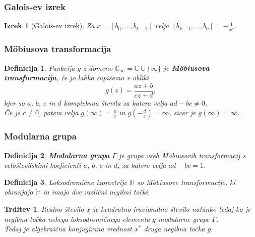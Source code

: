 \documentclass{beamer}
\newtheorem{izrek}[theorem]{Izrek}
\newtheorem{trditev}[theorem]{Trditev}
\newtheorem{definicija}{Definicija}
\begin{document}
\begin{frame}
\frametitle{Galois-ev izrek}
\begin{izrek}[Galois-ev izrek]
    \label{Galois}
    Za $x = \overline{[b_0, \ldots, b_{k-1}]}$ velja $\overline{[b_{k-1}, \ldots, b_0]} = - \frac{1}{x^*}.$
\end{izrek}
\end{frame}



\begin{frame}
\frametitle{M\"obiusova transformacija}
\begin{definicija}
    Funkcija $g$ z domeno $\mathbb{C}_{\infty} = \mathbb{C} \cup \{\infty\}$ je \textbf{M\"obiusova transformacija}, če jo lahko zapišemo v obliki
    \[
        g(z) = \frac{az + b}{cz + d},
    \]
    kjer so $a$, $b$, $c$ in $d$ kompleksna števila za katera velja $ad - bc \neq 0$. \\
    Če je $c \neq 0$, potem velja $g(\infty) = \frac{a}{c}$ in $g(-\frac{d}{c}) = \infty$, sicer je $g(\infty) = \infty$.
\end{definicija}
\end{frame}

\begin{frame}
\frametitle{Modularna grupa}
\begin{definicija}
    \textbf{Modularna grupa} $\Gamma$ je grupa vseh M\"obiusovih transformacij s celoštevilskimi koeficienti $a$, $b$, $c$ in $d$, za katere velja $ad - bc = 1$.
\end{definicija}
\pause
\begin{definicija}
    Loksodromične izometrije $\mathbb{H}$ so M\"obiusove transformacije, ki ohranjajo $\mathbb{H}$ in imajo dve različni negibni točki. 
\end{definicija}
\pause
\begin{trditev}
    Realno število $x$ je kvadratno iracionalno število natanko tedaj ko je negibna točka nekega loksodromičnega elementa $g$ modularne grupe $\Gamma$.\\
    Tedaj je algebraična konjugirana vrednost $x^*$ druga negibna točka $g$.
\end{trditev}

\end{frame}
\end{document}
